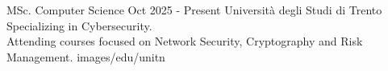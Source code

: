\EducationEntry
{MSc. Computer Science}
{Oct 2025 - Present}
{Università degli Studi di Trento}
{Specializing in Cybersecurity.\\
Attending courses focused on Network Security, Cryptography and Risk Management.}
{images/edu/unitn}
